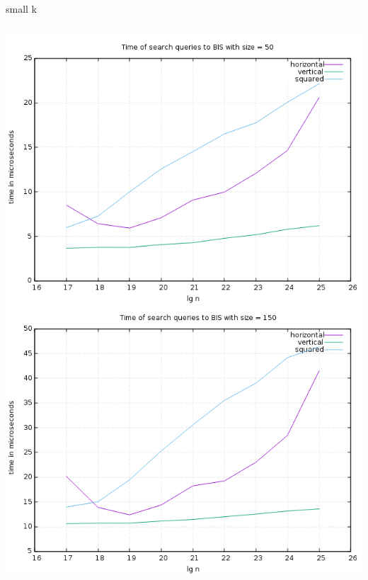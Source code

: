 \documentclass[pdf]{beamer}
\begin{document}
\begin{frame}{small k}
  \begin{columns}
    \includegraphics[scale=0.35]{pictures/analysis/smalls/all_50.png}
    \includegraphics[scale=0.35]{pictures/analysis/smalls/all_150.png}
  \end{columns}
\end{frame}
\end{document}
